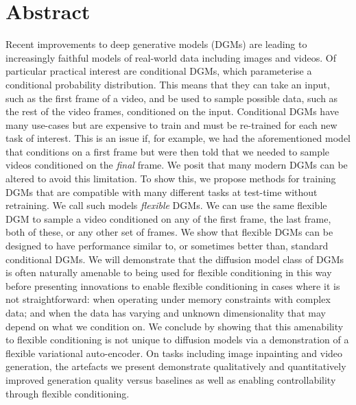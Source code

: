 
\chapter{Abstract}

Recent improvements to deep generative models (DGMs) are leading to increasingly faithful models of real-world data including images and videos. Of particular practical interest are conditional DGMs, which parameterise a conditional probability distribution. This means that they can take an input, such as the first frame of a video, and be used to sample possible data, such as the rest of the video frames, conditioned on the input. Conditional DGMs have many use-cases but are expensive to train and must be re-trained for each new task of interest. This is an issue if, for example, we had the aforementioned model that conditions on a first frame but were then told that we needed to sample videos conditioned on the \textit{final} frame. We posit that many modern DGMs can be altered to avoid this limitation. To show this, we propose methods for training DGMs that are compatible with many different tasks at test-time without retraining. We call such models \textit{flexible} DGMs. We can use the same flexible DGM to sample a video conditioned on any of the first frame, the last frame, both of these, or any other set of frames. We show that flexible DGMs can be designed to have performance similar to, or sometimes better than, standard conditional DGMs. We will demonstrate that the diffusion model class of DGMs is often naturally amenable to being used for flexible conditioning in this way before presenting innovations to enable flexible conditioning in cases where it is not straightforward: when operating under memory constraints with complex data; and when the data has varying and unknown dimensionality that may depend on what we condition on. We conclude by showing that this amenability to flexible conditioning is not unique to diffusion models via a demonstration of a flexible variational auto-encoder. On tasks including image inpainting and video generation, the artefacts we present demonstrate qualitatively and quantitatively improved generation quality versus baselines as well as enabling controllability through flexible conditioning.
